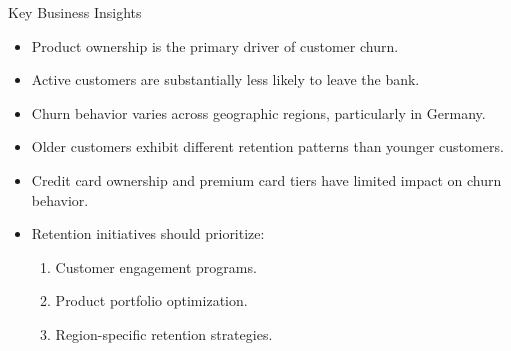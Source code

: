 \begin{frame}{Key Business Insights}
\begin{itemize}
\item Product ownership is the primary driver of customer churn.

\item Active customers are substantially less likely to leave the bank.

\item Churn behavior varies across geographic regions, particularly in Germany.

\item Older customers exhibit different retention patterns than younger customers.

\item Credit card ownership and premium card tiers have limited impact on churn behavior.

\item Retention initiatives should prioritize:
\begin{enumerate}
    \item Customer engagement programs.
    \item Product portfolio optimization.
    \item Region-specific retention strategies.
\end{enumerate}

\end{itemize}
\end{frame}

